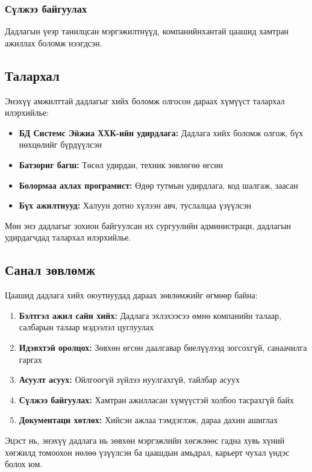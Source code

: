 \documentclass[main.tex]{subfiles}
\begin{document}
\subsubsection{Сүлжээ байгуулах}
Дадлагын үеэр танилцсан мэргэжилтнүүд, компанийнхантай цаашид хамтран ажиллах боломж нээгдсэн.

\subsection{Талархал}

Энэхүү амжилттай дадлагыг хийх боломж олгосон дараах хүмүүст талархал илэрхийлье:

\begin{itemize}
    \item \textbf{БД Системс Эйжиа ХХК-ийн удирдлага:} Дадлага хийх боломж олгож, бүх нөхцөлийг бүрдүүлсэн
    \item \textbf{Батзориг багш:} Төсөл удирдан, техник зөвлөгөө өгсөн
    \item \textbf{Болормаа ахлах програмист:} Өдөр тутмын удирдлага, код шалгаж, заасан
    \item \textbf{Бүх ажилтнууд:} Халуун дотно хүлээн авч, туслалцаа үзүүлсэн
\end{itemize}

Мөн энэ дадлагыг зохион байгуулсан их сургуулийн администраци, дадлагын удирдагчдад талархал илэрхийлье.

\subsection{Санал зөвлөмж}

Цаашид дадлага хийх оюутнуудад дараах зөвлөмжийг өгмөөр байна:

\begin{enumerate}
    \item \textbf{Бэлтгэл ажил сайн хийх:} Дадлага эхлэхээсээ өмнө компанийн талаар, салбарын талаар мэдээлэл цуглуулах
    \item \textbf{Идэвхтэй оролцох:} Зөвхөн өгсөн даалгавар биелүүлээд зогсохгүй, санаачилга гаргах
    \item \textbf{Асуулт асуух:} Ойлгоогүй зүйлээ нуулгахгүй, тайлбар асуух
    \item \textbf{Сүлжээ байгуулах:} Хамтран ажилласан хүмүүстэй холбоо тасрахгүй байх
    \item \textbf{Документаци хөтлөх:} Хийсэн ажлаа тэмдэглэж, дараа дахин ашиглах
\end{enumerate}

Эцэст нь, энэхүү дадлага нь зөвхөн мэргэжлийн хөгжлөөс гадна хувь хүний хөгжилд томоохон нөлөө үзүүлсэн ба цаашдын амьдрал, карьерт чухал үндэс болох юм.
\end{document}

